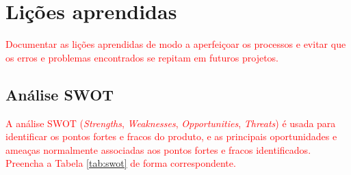 \chapter{Lições aprendidas}

\textcolor{red}{Documentar as lições aprendidas de modo a aperfeiçoar os processos e evitar que os erros e problemas encontrados se repitam em futuros projetos.}

\section{Análise SWOT}

\textcolor{red}{A análise SWOT (\textit{Strengths}, \textit{Weaknesses}, \textit{Opportunities}, \textit{Threats}) é usada para identificar os pontos fortes e fracos do produto, e as principais oportunidades e ameaças normalmente associadas aos pontos fortes e fracos identificados. Preencha a Tabela \ref{tab:swot} de forma correspondente.}

